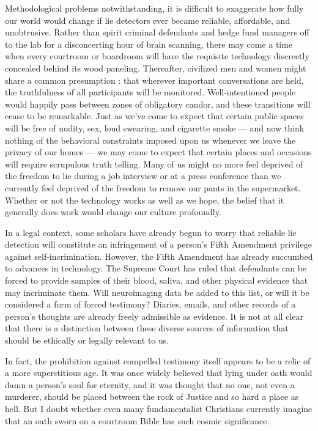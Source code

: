 \documentclass[a4paper,14pt]{extarticle}
\begin{document}
Methodological problems notwithstanding, it is difficult to exaggerate how fully our world would change if lie detectors ever became reliable, affordable, and unobtrusive.
Rather than spirit criminal defendants and hedge fund managers off to the lab for a disconcerting hour of brain scanning, there may come a time when every courtroom or boardroom will have the requisite technology discreetly concealed behind its wood paneling.
Thereafter, civilized men and women might share a common presumption :
that wherever important conversations are held, the truthfulness of all participants will be monitored.
Well-intentioned people would happily pass between zones of obligatory candor, and these transitions will cease to be remarkable.
Just as we’ve come to expect that certain public spaces will be free of nudity, sex, loud swearing, and cigarette smoke --- and now think nothing of the behavioral constraints imposed upon us whenever we leave the privacy of our homes --- we may come to expect that certain places and occasions will require scrupulous truth telling.
Many of us might no more feel deprived of the freedom to lie during a job interview or at a press conference than we currently feel deprived of the freedom to remove our pants in the supermarket.
Whether or not the technology works as well as we hope, the belief that it generally does work would change our culture profoundly.

In a legal context, some scholars have already begun to worry that reliable lie detection will constitute an infringement of a person’s Fifth Amendment privilege against self-incrimination.
However, the Fifth Amendment has already succumbed to advances in technology.
The Supreme Court has ruled that defendants can be forced to provide samples of their blood, saliva, and other physical evidence that may incriminate them.
Will neuroimaging data be added to this list, or will it be considered a form of forced testimony?
Diaries, emails, and other records of a person’s thoughts are already freely admissible as evidence.
It is not at all clear that there is a distinction between these diverse sources of information that should be ethically or legally relevant to us.

In fact, the prohibition against compelled testimony itself appears to be a relic of a more superstitious age.
It was once widely believed that lying under oath would damn a person’s soul for eternity, and it was thought that no one, not even a murderer, should be placed between the rock of Justice and so hard a place as hell.
But I doubt whether even many fundamentalist Christians currently imagine that an oath sworn on a courtroom Bible has such cosmic significance.
\end{document}
